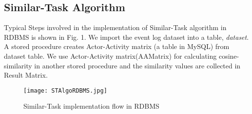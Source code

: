 \documentclass[11pt]{article}
\begin{document}
\subsection{Similar-Task Algorithm}
\par{Typical Steps involved in the implementation of Similar-Task algorithm in RDBMS is shown in Fig. 1. We import the event log dataset into a table, \textit{dataset}. A stored procedure creates Actor-Activity matrix (a table in MySQL) from dataset table. We use Actor-Activity matrix(AAMatrix) for calculating cosine-similarity in another stored procedure and the similarity values are collected in Result Matrix.}
\begin{figure}
  \centering
  \caption{Similar-Task implementation flow in RDBMS}
  \texttt{[image: STAlgoRDBMS.jpg]}
 \end{figure}
\end{document}
